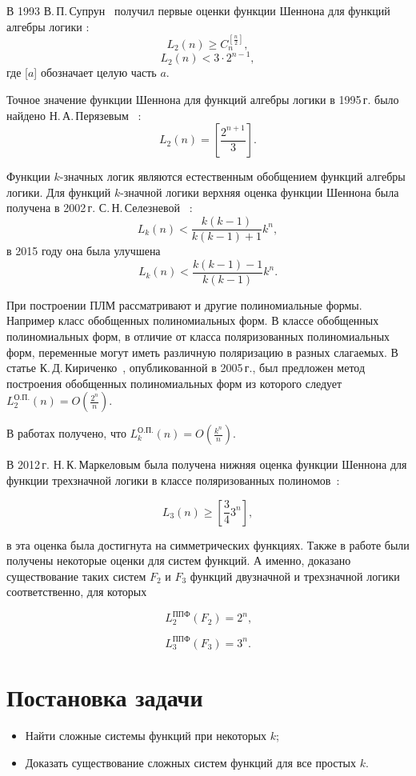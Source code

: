 \documentclass [12pt, a4paper] {extarticle}
\begin{document}
В 1993  В.\,П.\,Супрун~\cite{sv93} получил первые оценки функции Шеннона для
функций алгебры логики :
$$
L_2(n) \geqslant C_n^{[\frac{n}{2}]},
$$
$$
L_2(n) < 3 \cdot 2^{n-1},
$$
где [$a$] обозначает целую часть $a$.

Точное значение функции Шеннона для функций алгебры логики в 1995\,г. было
найдено Н.\,А.\,Перязевым~\cite{pn95} :
$$
L_2(n) = \left[\frac{2^{n+1}}{3}\right].
$$

Функции $k$\nobreakdash-значных логик являются естественным обобщением функций
алгебры логики.  Для функций $k$\nobreakdash-значной логики верхняя оценка
функции Шеннона была получена в 2002\,г. С.\,Н.\,Селезневой~\cite{ss02} :
$$
L_k(n) < \frac{k(k-1)}{k(k-1)+1}k^n,
$$
в 2015 году она была улучшена \cite{by15}
$$
L_k(n) < \frac{k(k-1)-1}{k(k-1)}k^n.
$$


При построении ПЛМ рассматривают и другие полиномиальные формы. Например класс
обобщенных полиномиальных форм.  В классе обобщенных полиномиальных форм, в
отличие от класса поляризованных полиномиальных форм, переменные могут иметь
различную поляризацию в разных слагаемых. В статье
К.\,Д.\,Кириченко~\cite{kk05}, опубликованной в 2005\,г., был предложен метод
построения обобщенных полиномиальных форм из которого следует
$L^{\text{О.П.}}_2(n) = O(\frac{2 ^ n}{n})$.

В работах \cite{sd08, bs14} получено, что
$L^{\text{О.П.}}_k(n) = O(\frac{k ^ n}{n})$.

В 2012\,г. Н.\,К.\,Маркеловым была получена нижняя оценка функции Шеннона для
функции трехзначной логики в классе поляризованных полиномов~\cite{mn12}: 

\[ L_3(n) \geqslant \left[\frac{3}{4}3^n\right], \] 

в \cite{ss15} эта оценка была достигнута на симметрических функциях.  Также в
работе \cite{ss15} были получены некоторые оценки для систем функций.  А
именно, доказано существование таких систем $F_2$ и $F_3$ функций двузначной и
трехзначной логики соответственно, для которых

\[ L_2^\text{ППФ}(F_2) = 2^n \text{,} \] 

\[ L_3^\text{ППФ}(F_3) = 3^n \text{.} \]

\newpage
\section{Постановка задачи}
\begin{itemize}
    \item Найти сложные системы функций при некоторых $k$;

    \item Доказать существование сложных систем функций для все простых $k$.
\end{itemize}
    
\end{document}

